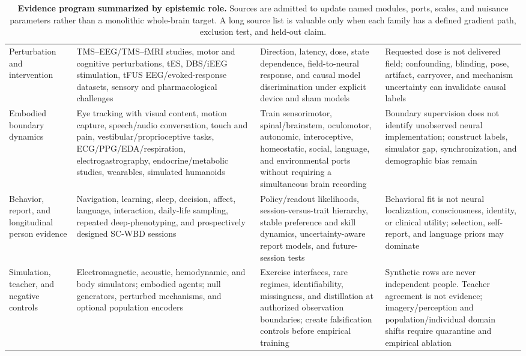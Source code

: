 \begin{table}[!h]
\begin{tabularx}{\textwidth}{@{}p{}p{}p{}X@{}}
Perturbation and intervention &
TMS--EEG/TMS--fMRI studies, motor and cognitive perturbations, tES, DBS/iEEG
stimulation, tFUS EEG/evoked-response datasets, sensory and pharmacological
challenges &
Direction, latency, dose, state dependence, field-to-neural response, and
causal model discrimination under explicit device and sham models &
Requested dose is not delivered field; confounding, blinding, pose, artifact,
carryover, and mechanism uncertainty can invalidate causal labels\\

Embodied boundary dynamics &
Eye tracking with visual content, motion capture, speech/audio conversation,
touch and pain, vestibular/proprioceptive tasks, ECG/PPG/EDA/respiration,
electrogastrography, endocrine/metabolic studies, wearables, simulated humanoids &
Train sensorimotor, spinal/brainstem, oculomotor, autonomic, interoceptive,
homeostatic, social, language, and environmental ports without requiring a
simultaneous brain recording &
Boundary supervision does not identify unobserved neural implementation;
construct labels, simulator gap, synchronization, and demographic bias remain\\

Behavior, report, and longitudinal person evidence &
Navigation, learning, sleep, decision, affect, language, interaction, daily-life
sampling, repeated deep-phenotyping, and prospectively designed SC-WBD sessions &
Policy/readout likelihoods, session-versus-trait hierarchy, stable preference
and skill dynamics, uncertainty-aware report models, and future-session tests &
Behavioral fit is not neural localization, consciousness, identity, or clinical
utility; selection, self-report, and language priors may dominate\\

Simulation, teacher, and negative controls &
Electromagnetic, acoustic, hemodynamic, and body simulators; embodied agents; null
generators, perturbed mechanisms, and optional population encoders &
Exercise interfaces, rare regimes, identifiability, missingness, and
distillation at authorized observation boundaries; create falsification
controls before empirical training &
Synthetic rows are never independent people. Teacher agreement is not
evidence; imagery/perception and population/individual domain shifts require
quarantine and empirical ablation\\
\bottomrule
\end{tabularx}
\caption{\textbf{Evidence program summarized by epistemic role.} Sources are
admitted to update named modules, ports, scales, and nuisance parameters rather
than a monolithic whole-brain target. A long source list is valuable only when
each family has a defined gradient path, exclusion test, and held-out claim.}
\label{tab:source-role-summary}
\end{table}

